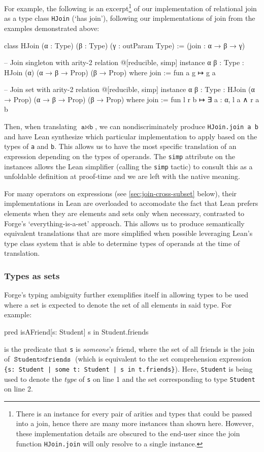 For example, the following is an excerpt\footnote{There is an instance for every pair of arities and types that could be passed into a join, hence there are many more instances than shown here. However, these implementation details are obscured to the end-user since the join function \texttt{HJoin.join} will only resolve to a single instance.} of our implementation of relational join as a type class \texttt{HJoin} (`has join'), following our implementations of join from the examples demonstrated above: 

\begin{leanimpl*}
class HJoin (α : Type) (β : Type) (γ : outParam Type) :=
  (join : α → β → γ)

-- Join singleton with arity-2 relation
@[reducible, simp] instance {α β : Type} : HJoin (α) (α → β → Prop) (β → Prop) where
  join := fun a g ↦ g a

-- Join set with arity-2 relation
@[reducible, simp] instance {α β : Type} : HJoin (α → Prop) (α → β → Prop) (β → Prop) where
  join := fun l r b ↦ ∃ a : α, l a ∧ r a b
\end{leanimpl*}

Then, when translating $\texttt{a}\bowtie \texttt{b}$, we can nondiscriminately produce \texttt{HJoin.join a b} and have Lean synthesize which particular implementation to apply based on the types of \texttt{a} and \texttt{b}. This allows us to have the most specific translation of an expression depending on the types of operands. The \texttt{simp} attribute on the instances allows the Lean simplifier (calling the \texttt{simp} tactic) to consult this as a unfoldable definition at proof-time and we are left with the native meaning.

For many operators on expressions (see \cref{sec:join-cross-subset} below), their implementations in Lean are overloaded to accomodate the fact that Lean prefers elements when they are elements and sets only when necessary, contrasted to Forge's `everything-is-a-set' approach. This allows us to produce semantically equivalent translations that are more simplified when possible leveraging Lean's type class system that is able to determine types of operands at the time of translation. 

\subsubsection{Types as sets}
Forge's typing ambiguity further exemplifies itself in allowing types to be used where a set is expected to denote the set of all elements in said type. For example:
\begin{forge}
pred isAFriend[s: Student] {
  s in Student.friends
}
\end{forge}
is the predicate that \texttt{s} is \emph{someone}'s friend, where the set of all friends is the join of $\texttt{Student} \bowtie \texttt{friends}$ (which is equivalent to the set comprehension expression \texttt{\{s: Student | some t: Student | s in t.friends\}}). Here, \texttt{Student} is being used to denote the \emph{type} of \texttt{s} on line 1 and the set corresponding to type \texttt{Student} on line 2. 

